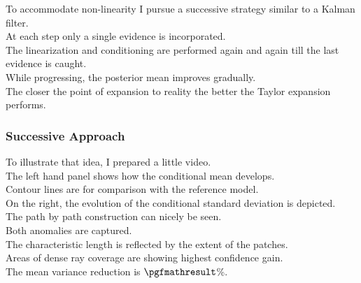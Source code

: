 \documentclass[aspectratio=169, t, 10pt,
    ]{beamer}
\begin{document}
To accommodate non-linearity I pursue a successive strategy similar to a Kalman filter.
\\
At each step only a single evidence is incorporated.
\\
The linearization and conditioning are performed again and again till the last evidence is caught.
\\
While progressing, the posterior mean improves gradually.
\\
The closer the point of expansion to reality the better the Taylor expansion performs.


\begin{frame}
    \frametitle{Successive Approach}
    \begin{center}
    \end{center}
\end{frame}

To illustrate that idea, I prepared a little video.
\\
The left hand panel shows how the conditional mean develops.
\\
Contour lines are for comparison with the reference model.
\\
On the right, the evolution of the conditional standard deviation is depicted.
\\[2mm]

The path by path construction can nicely be seen.
\\
Both anomalies are captured.
\\
The characteristic length is reflected by the extent of the patches.
\\
Areas of dense ray coverage are showing highest confidence gain.
\\
The mean variance reduction is $\pgfmathresult$\%.
\end{document}
